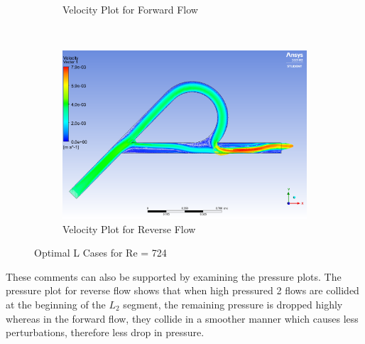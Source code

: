 \begin{figure}[H]
\begin{subfigure}{.45\textwidth}
  \caption{Velocity Plot for Forward Flow}
  \label{fig:x_d_norm}
\end{subfigure}%
~
\begin{subfigure}{.45\textwidth}
  \centering
  \includegraphics[width=.9\linewidth]{images/task2/myopt/reverse_velocity.png}
  \caption{Velocity Plot for Reverse Flow}
  \label{fig:x_d_norm_actual}
\end{subfigure}

\caption{Optimal L Cases for Re = 724}
\label{fig:opt}
\end{figure}

These comments can also be supported by examining the pressure plots. The pressure plot for reverse flow shows that when high pressured 2 flows are collided at the beginning of the $L_2$ segment, the remaining pressure is dropped highly whereas in the forward flow, they collide in a smoother manner which causes less perturbations, therefore less drop in pressure.

